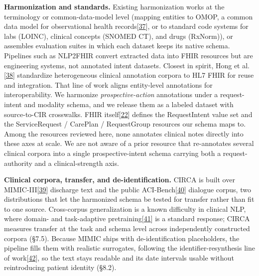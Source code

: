 \textbf{Harmonization and standards.} Existing harmonization works at the terminology or common-data-model level (mapping entities to OMOP, a common data model for observational health records{[}\hyperref[r37]{37}{]}, or to standard code systems for labs (LOINC), clinical concepts (SNOMED CT), and drugs (RxNorm)), or assembles evaluation suites in which each dataset keeps its native schema. Pipelines such as NLP2FHIR convert extracted data into FHIR resources but are engineering systems, not annotated intent datasets. Closest in spirit, Hong et al.{[}\hyperref[r38]{38}{]} standardize heterogeneous clinical annotation corpora to HL7 FHIR for reuse and integration. That line of work aligns entity-level annotations for interoperability. We harmonize \emph{prospective-action} annotations under a request-intent and modality schema, and we release them as a labeled dataset with source-to-CIR crosswalks. FHIR itself{[}\hyperref[r22]{22}{]} defines the RequestIntent value set and the ServiceRequest / CarePlan / RequestGroup resources our schema maps to. Among the resources reviewed here, none annotates clinical notes directly into these axes at scale. We are not aware of a prior resource that re-annotates several clinical corpora into a single prospective-intent schema carrying both a request-authority and a clinical-strength axis.

\textbf{Clinical corpora, transfer, and de-identification.} CIRCA is built over MIMIC-III{[}\hyperref[r39]{39}{]} discharge text and the public ACI-Bench{[}\hyperref[r40]{40}{]} dialogue corpus, two distributions that let the harmonized schema be tested for transfer rather than fit to one source. Cross-corpus generalization is a known difficulty in clinical NLP, where domain- and task-adaptive pretraining{[}\hyperref[r41]{41}{]} is a standard response; CIRCA measures transfer at the task and schema level across independently constructed corpora (§7.5). Because MIMIC ships with de-identification placeholders, the pipeline fills them with realistic surrogates, following the identifier-resynthesis line of work{[}\hyperref[r42]{42}{]}, so the text stays readable and its date intervals usable without reintroducing patient identity (§8.2).

